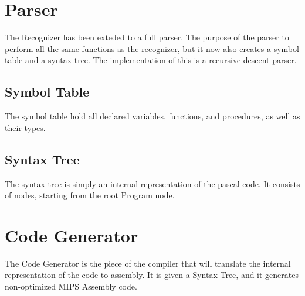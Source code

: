 \documentclass[12pt]{scrreprt}
\begin{document}
\section{Parser}
The Recognizer has been exteded to a full parser. The purpose of the parser to perform
all the same functions as the recognizer, but it now also creates a symbol table and
a syntax tree. The implementation of this is a recursive descent parser.
\subsection{Symbol Table}
The symbol table hold all declared variables, functions, and procedures, as well as 
their types.

\subsection{Syntax Tree}
The syntax tree is simply an internal representation of the pascal code. It consists of
nodes, starting from the root Program node.

\section{Code Generator}
The Code Generator is the piece of the compiler that will translate the internal representation
of the code to assembly. It is given a Syntax Tree, and it generates non-optimized MIPS
Assembly code.
\end{document}
